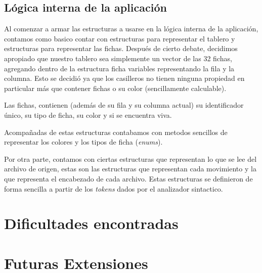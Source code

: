\documentclass[a4paper,10pt]{article}
\begin{document}
\subsection{Lógica interna de la aplicación }

Al comenzar a armar las estructuras a usarse en la lógica interna de la aplicación, contamos como basico contar con estructuras
para representar el tablero y estructuras para representar las fichas. Después de cierto debate, decidimos apropiado que nuestro
tablero sea simplemente un vector de las 32 fichas, agregando dentro de la estructura ficha variables representando la fila y la 
columna. Esto se decidió ya que los casilleros no tienen ninguna propiedad en particular más que contener fichas o su color 
(sencillamente calculable).

Las fichas, contienen (además de su fila y su columna actual) su identificador único, su tipo de ficha, su color y si se encuentra 
viva.

Acompañadas de estas estructuras contabamos con metodos sencillos de representar los colores y los tipos de ficha (\textit{enums}).

Por otra parte, contamos con ciertas estructuras que representan lo que se lee del archivo de origen, estas son las estructuras que 
representan cada movimiento y la que representa el encabezado de cada archivo. Estas estructuras se definieron de forma sencilla a 
partir de los \textit{tokens} dados por el analizador sintactico.





\newpage

\section{Dificultades encontradas}
\newpage

\section{Futuras Extensiones}
   
\end{document}
